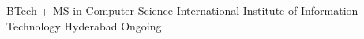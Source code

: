 
\begin{cventries}
  \cventry
    {BTech + MS in Computer Science} %
    {International Institute of Information Technology} %
    {Hyderabad} %
    {Ongoing} %
    {}
\end{cventries}
